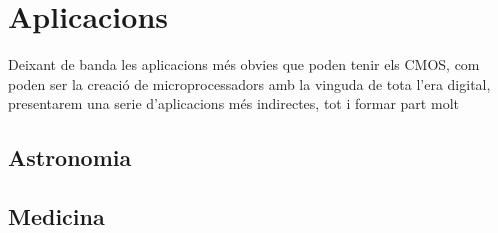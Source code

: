 \documentclass[11pt,a4paper]{article}
\begin{document}
\section{Aplicacions}

Deixant de banda les aplicacions més obvies que poden tenir els CMOS, com poden ser la creació de microprocessadors amb la vinguda de tota l'era digital, presentarem una serie d'aplicacions més indirectes, tot i formar part molt 

\subsection{Astronomia}
\subsection{Medicina}



\printbibliography
\end{document}
